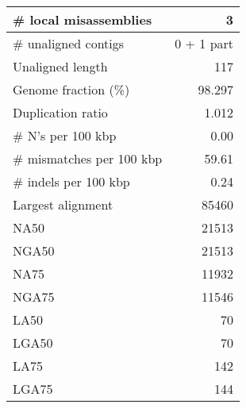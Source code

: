 \documentclass[12pt,a4paper]{article}
\begin{document}
\begin{table}[ht]
\begin{center}
\begin{tabular}{|l*{1}{|r}|}
\# local misassemblies & 3 \\ \hline
\# unaligned contigs & 0 + 1 part \\ \hline
Unaligned length & 117 \\ \hline
Genome fraction (\%) & 98.297 \\ \hline
Duplication ratio & 1.012 \\ \hline
\# N's per 100 kbp & 0.00 \\ \hline
\# mismatches per 100 kbp & 59.61 \\ \hline
\# indels per 100 kbp & 0.24 \\ \hline
Largest alignment & 85460 \\ \hline
NA50 & 21513 \\ \hline
NGA50 & 21513 \\ \hline
NA75 & 11932 \\ \hline
NGA75 & 11546 \\ \hline
LA50 & 70 \\ \hline
LGA50 & 70 \\ \hline
LA75 & 142 \\ \hline
LGA75 & 144 \\ \hline
\end{tabular}
\end{center}
\end{table}
\end{document}
